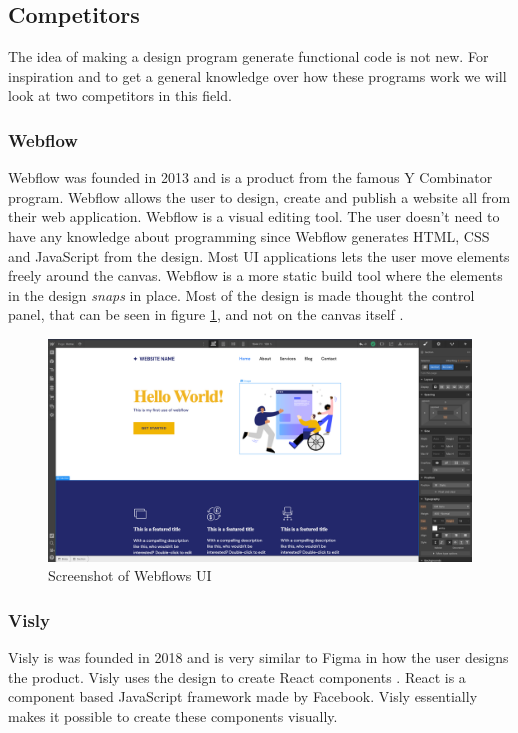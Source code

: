 \subsection{Competitors}%
\label{sub:Competitors}
The idea of making a design program generate functional code is not new. For inspiration and to get a general knowledge over how these programs work we will look at two competitors in this field. 

\subsubsection{Webflow}
Webflow was founded in 2013 and is a product from the famous Y Combinator program. Webflow allows the user to design, create and publish a website all from their web application. Webflow is a visual editing tool. The user doesn't need to have any knowledge about programming since Webflow generates HTML, CSS and JavaScript from the design. Most UI applications lets the user move elements freely around the canvas. Webflow is a more static build tool where the elements in the design \textit{snaps} in place. Most of the design is made thought the control panel, that can be seen in figure \ref{fig:webflow}, and not on the canvas itself \cite{ResponsiveWebDesign}.

\begin{figure}[H]
  \centering
  \includegraphics[width=0.8\linewidth]{images/webflow.png}
  \caption{Screenshot of Webflows UI }%
  \label{fig:webflow}
\end{figure}

\subsubsection{Visly}%
\label{ssub:Visly}
Visly is was founded in 2018 and is very similar to Figma in how the user designs the product. Visly uses the design to create React components \cite{facebookincReactJavaScriptLibrary}. React is a component based JavaScript framework made by Facebook. Visly essentially makes it possible to create these components visually. 

